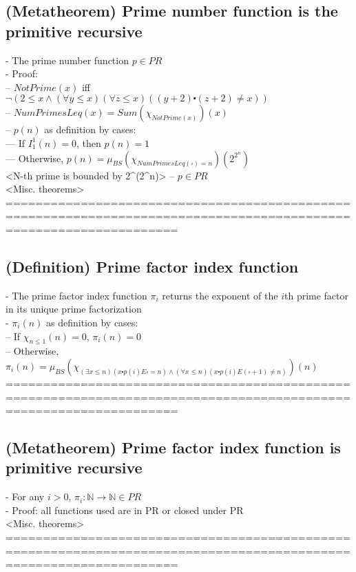 \documentclass{book}
\newcommand{\inot}{\not}
\newcommand{\placeholder}{\square}
\begin{document}
\subsection{(Metatheorem) Prime number function is the primitive recursive} %
	- The prime number function $p \in PR$ \\
	- Proof: \\
		-- $NotPrime(x)$ iff $\lnot(2 \leq x \land (\forall y \leq x) (\forall z \leq x) ((y+2) \centerdot (z+2) \inot = x))$ \\
		-- $NumPrimesLeq(x) = Sum(\chi_{NotPrime(x)})(x)$ \\
		-- $p(n)$ as definition by cases: \\
			--- If $I_1^1(n) = 0$, then $p(n) = 1$ \\
			--- Otherwise, $p(n) = \mu_{BS}(\chi_{NumPrimesLeq(\placeholder) = n})(2^{2^n})$ \\ <N-th prime is bounded by 2\string^(2\string^n)>
		-- $p \in PR$ \\ <Misc. theorems>
	===================================================================================================================
\subsection{(Definition) Prime factor index function} %
	- The prime factor index function $\pi_i$ returns the exponent of the $i$th prime factor in its unique prime factorization \\
	- $\pi_i(n)$ as definition by cases: \\
		-- If $\chi_{n \leq 1}(n) = 0$, $\pi_i(n) = 0$ \\
		-- Otherwise, $\pi_i(n) = \mu_{BS}(\chi_{(\exists x \leq n) (x \centerdot p(i) E \placeholder = n) \land (\forall x \leq n) (x \centerdot p(i) E (\placeholder+1) \inot = n)})(n)$ \\
	===================================================================================================================
\subsection{(Metatheorem) Prime factor index function is primitive recursive} %
	- For any $i > 0$, $\pi_i: \mathbb{N} \rightarrow \mathbb{N} \in PR$ \\
	- Proof: all functions used are in PR or closed under PR \\ <Misc. theorems>
	===================================================================================================================
\end{document}
